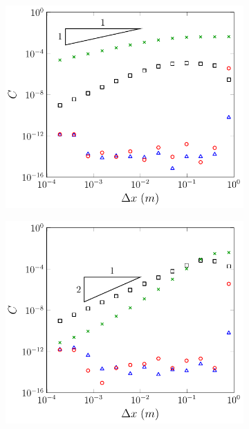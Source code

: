 \begin{figure}
	\centering
	\begin{subfigure}{0.5\textwidth}
		\includegraphics[width=\textwidth]{./chp5/figures/Analytic/Soliton/C1/FDVM1.pdf}
		\vspace{0.3cm}
	\end{subfigure}%
	\begin{subfigure}{0.5\textwidth}
		\includegraphics[width=\textwidth]{./chp5/figures/Analytic/Soliton/C1/FDVM2.pdf}

\end{subfigure}
\end{figure}
